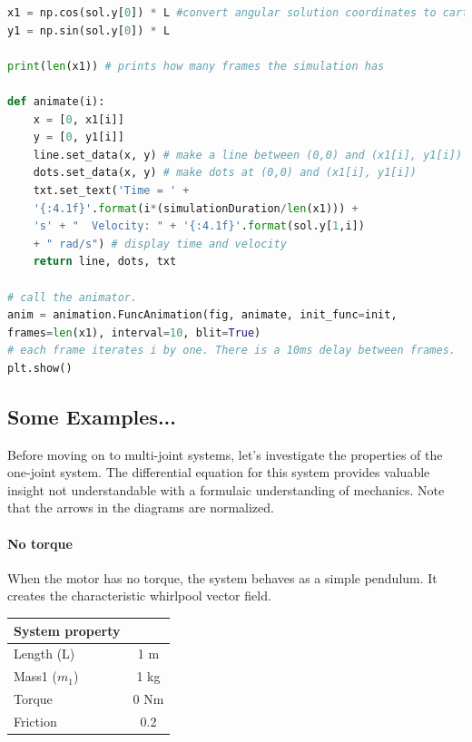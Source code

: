 \documentclass{article}
\begin{document}
\begin{lstlisting}[language=Python]
x1 = np.cos(sol.y[0]) * L #convert angular solution coordinates to cartesian for animating
y1 = np.sin(sol.y[0]) * L 

print(len(x1)) # prints how many frames the simulation has

def animate(i):
    x = [0, x1[i]]  
    y = [0, y1[i]]
    line.set_data(x, y) # make a line between (0,0) and (x1[i], y1[i])
    dots.set_data(x, y) # make dots at (0,0) and (x1[i], y1[i])
    txt.set_text('Time = ' +
    '{:4.1f}'.format(i*(simulationDuration/len(x1))) +
    's' + "  Velocity: " + '{:4.1f}'.format(sol.y[1,i])
    + " rad/s") # display time and velocity 
    return line, dots, txt

# call the animator.
anim = animation.FuncAnimation(fig, animate, init_func=init, 
frames=len(x1), interval=10, blit=True)  
# each frame iterates i by one. There is a 10ms delay between frames.
plt.show()
\end{lstlisting}

\subsection{Some Examples...}
\noindent \justifying Before moving on to multi-joint systems, let's investigate the properties of the one-joint system. The differential equation for this system provides valuable insight not understandable with a formulaic understanding of mechanics. Note that the arrows in the diagrams are normalized. 

\newpage

\paragraph{No torque}
When the motor has no torque, the system behaves as a simple pendulum. It creates the characteristic whirlpool vector field. 

\vspace{14pt}
\begin{table}[h]
\centering
\begin{tabular}{|l|c|}
\hline
System property & \\
\hline
Length (L) & 1 m \\
Mass1 ($m_1$) & 1 kg \\
Torque & 0 Nm \\
Friction & 0.2 \\
\hline
\end{tabular}
\label{tab:quantities}
\end{table}
\end{document}
